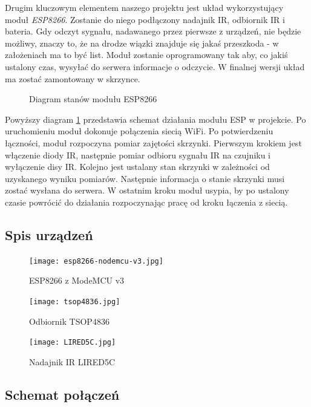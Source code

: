 Drugim kluczowym elementem naszego projektu jest układ wykorzystujący moduł \emph{ESP8266}. Zostanie do niego podłączony nadajnik IR, odbiornik IR i bateria. Gdy odczyt sygnału, nadawanego przez pierwsze z urządzeń, nie będzie możliwy, znaczy to, że na drodze wiązki znajduje się jakaś przeszkoda - w założeniach ma to być list. Moduł zostanie oprogramowany tak aby, co jakiś ustalony czas, wysyłać do serwera informacje o odczycie. W finalnej wersji układ ma zostać zamontowany w skrzynce.

\begin{figure}[H]
	\caption{Diagram stanów modułu ESP8266}
	\label{DiagramESP}
\end{figure}

Powyższy diagram \ref{DiagramESP} przedstawia schemat działania modułu ESP w projekcie. Po uruchomieniu moduł dokonuje połączenia siecią WiFi. Po potwierdzeniu łączności, moduł rozpoczyna pomiar zajętości skrzynki. Pierwszym krokiem jest włączenie diody IR, następnie pomiar odbioru sygnału IR na czujniku i wyłączenie disy IR. Kolejno jest ustalany stan skrzynki w zależności od uzyskanego wyniku pomiarów. Następnie informacja o stanie skrzynki musi zostać wysłana do serwera. W ostatnim kroku moduł usypia, by po ustalony czasie powrócić do działania rozpoczynając pracę od kroku łączenia z siecią.

\subsection{Spis urządzeń}



	\begin{figure}[H]
	\centering
	\texttt{[image: esp8266-nodemcu-v3.jpg]}
	\caption{ESP8266 z ModeMCU v3}
	\end{figure}
	
	\begin{figure}[H]
	\centering
	\texttt{[image: tsop4836.jpg]}
	\caption{Odbiornik TSOP4836 }
	\end{figure}
	
	
	\begin{figure}[H]
	\centering
	\texttt{[image: LIRED5C.jpg]}
	\caption{Nadajnik IR LIRED5C}
	\end{figure}

\subsection{Schemat połączeń}


